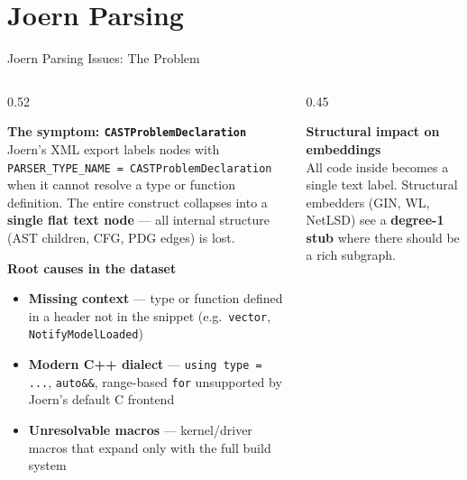 \documentclass[aspectratio=169,10pt]{beamer}
\begin{document}
\section{Joern Parsing}

\begin{frame}{Joern Parsing Issues: The Problem}
\begin{columns}[T]
\begin{column}{0.52\textwidth}

  \textbf{The symptom: \texttt{CASTProblemDeclaration}}\\[2pt]
  Joern's XML export labels nodes with
  \texttt{PARSER\_TYPE\_NAME = CASTProblemDeclaration} when it cannot
  resolve a type or function definition.  The entire construct
  collapses into a \textbf{single flat text node} — all internal
  structure (AST children, CFG, PDG edges) is lost.

  \vspace{0.6em}
  \textbf{Root causes in the dataset}\\[2pt]
  \begin{itemize}\setlength{\itemsep}{1pt}
    \item \textbf{Missing context} — type or function defined in a header
          not in the snippet
          (e.g.\ \texttt{vector}, \texttt{NotifyModelLoaded})
    \item \textbf{Modern C++ dialect} — \texttt{using type = ...},
          \texttt{auto\&\&}, range-based \texttt{for} unsupported
          by Joern's default C frontend
    \item \textbf{Unresolvable macros} — kernel/driver macros that expand
          only with the full build system
  \end{itemize}

\end{column}
\begin{column}{0.45\textwidth}

  \textbf{Structural impact on embeddings}\\[2pt]
  All code inside becomes a single text label.
  Structural embedders (GIN, WL, NetLSD) see a \textbf{degree-1 stub}
  where there should be a rich subgraph.


\end{column}
\end{columns}
\end{frame}
\end{document}

